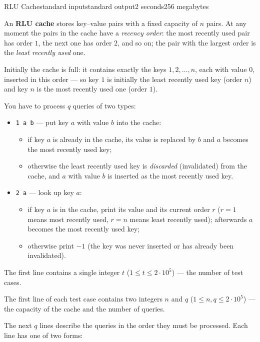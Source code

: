 \begin{problem}{RLU Cache}{standard input}{standard output}{2 seconds}{256 megabytes}

An \textbf{RLU cache} stores key--value pairs with a fixed capacity of $n$ pairs. At any moment the pairs in the cache have a \emph{recency order}: the most recently used pair has order $1$, the next one has order $2$, and so on; the pair with the largest order is the \emph{least recently used} one.

Initially the cache is full: it contains exactly the keys $1, 2, \ldots, n$, each with value $0$, inserted in this order --- so key $1$ is initially the least recently used key (order $n$) and key $n$ is the most recently used one (order $1$).

You have to process $q$ queries of two types:

\begin{itemize}
  \item \texttt{1 a b} --- put key $a$ with value $b$ into the cache:
    \begin{itemize}
      \item if key $a$ is already in the cache, its value is replaced by $b$ and $a$ becomes the most recently used key;
      \item otherwise the least recently used key is \emph{discarded} (invalidated) from the cache, and $a$ with value $b$ is inserted as the most recently used key.
    \end{itemize}
  \item \texttt{2 a} --- look up key $a$:
    \begin{itemize}
      \item if key $a$ is in the cache, print its value and its current order $r$ ($r = 1$ means most recently used, $r = n$ means least recently used); afterwards $a$ becomes the most recently used key;
      \item otherwise print $-1$ (the key was never inserted or has already been invalidated).
    \end{itemize}
\end{itemize}


\InputFile
The first line contains a single integer $t$ ($1 \le t \le 2 \cdot 10^5$) --- the number of test cases.

The first line of each test case contains two integers $n$ and $q$ ($1 \le n, q \le 2 \cdot 10^5$) --- the capacity of the cache and the number of queries.

The next $q$ lines describe the queries in the order they must be processed. Each line has one of two forms:


\end{problem}
